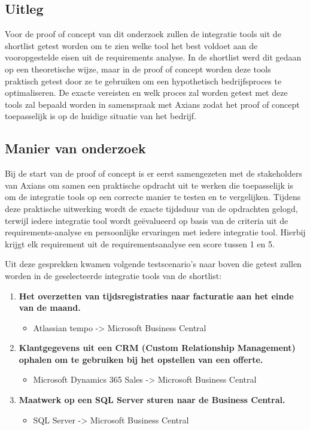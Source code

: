 \subsection{Uitleg}
\label{sec:UitlegBP}

Voor de proof of concept van dit onderzoek zullen de integratie tools uit de shortlist getest worden om te zien welke tool het best voldoet aan de vooropgestelde eisen uit de requirements analyse. In de shortlist werd dit gedaan op een theoretische wijze, maar in de proof of concept worden deze tools praktisch getest door ze te gebruiken om een hypothetisch bedrijfsproces te optimaliseren. De exacte vereisten en welk proces zal worden getest met deze tools zal bepaald worden in samenspraak met Axians zodat het proof of concept toepasselijk is op de huidige situatie van het bedrijf.

\subsection{Manier van onderzoek}
\label{sec:Manier van onderzoekBP}

Bij de start van de proof of concept is er eerst samengezeten met de stakeholders van Axians om samen een praktische opdracht uit te werken die toepasselijk is om de integratie tools op een correcte manier te testen en te vergelijken. Tijdens deze praktische uitwerking wordt de exacte tijdsduur van de opdrachten gelogd, terwijl iedere integratie tool wordt geëvalueerd op basis van de criteria uit de requirements-analyse en persoonlijke ervaringen met iedere integratie tool. Hierbij krijgt elk requirement uit de requirementsanalyse een score tussen 1 en 5.

\vspace{\baselineskip}

Uit deze gesprekken kwamen volgende testscenario’s naar boven die getest zullen worden in de geselecteerde integratie tools van de shortlist:

\begin{enumerate}
    \item \textbf{Het overzetten van tijdsregistraties naar facturatie aan het einde van de maand.}
    \begin{itemize}
        \item Atlassian tempo -> Microsoft Business Central
    \end{itemize}
    \item \textbf{Klantgegevens uit een CRM (Custom Relationship Management) ophalen om te gebruiken bij het opstellen van een offerte.}
    \begin{itemize}
        \item Microsoft Dynamics 365 Sales -> Microsoft Business Central
    \end{itemize}
    \item \textbf{Maatwerk op een SQL Server sturen naar de Business Central.}
    \begin{itemize}
        \item SQL Server -> Microsoft Business Central
    \end{itemize}
\end{enumerate}


